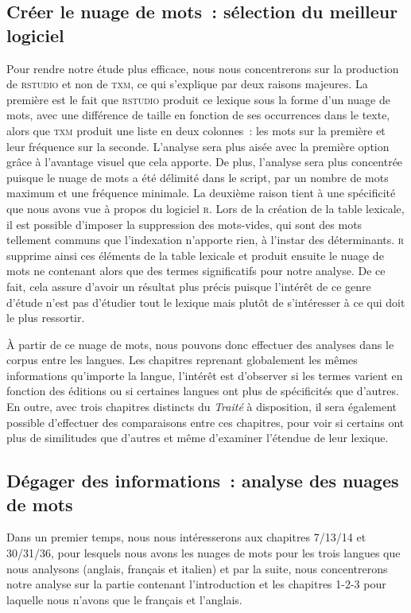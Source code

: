 \subsection{Créer le nuage de mots~: sélection du meilleur logiciel}
Pour rendre notre étude plus efficace, nous nous concentrerons sur la production de \textsc{rstudio} et non de \textsc{txm}, ce qui s'explique par deux raisons majeures. La première est le fait que \textsc{rstudio} produit ce lexique sous la forme d'un nuage de mots, avec une différence de taille en fonction de ses occurrences dans le texte, alors que \textsc{txm} produit une liste en deux colonnes~: les mots sur la première et leur fréquence sur la seconde. L'analyse sera plus aisée avec la première option grâce à l'avantage visuel que cela apporte. De plus, l'analyse sera plus concentrée puisque le nuage de mots a été délimité dans le script, par un nombre de mots maximum et une fréquence minimale. La deuxième raison tient à une spécificité que nous avons vue à propos du logiciel \textsc{r}. Lors de la création de la table lexicale, il est possible d'imposer la suppression des mots-vides, qui sont des mots tellement communs que l'indexation n'apporte rien, à l'instar des déterminants. \textsc{r} supprime ainsi ces éléments de la table lexicale et produit ensuite le nuage de mots ne contenant alors que des termes significatifs pour notre analyse. De ce fait, cela assure d'avoir un résultat plus précis puisque l'intérêt de ce genre d'étude n'est pas d'étudier tout le lexique mais plutôt de s'intéresser à ce qui doit le plus ressortir.

À partir de ce nuage de mots, nous pouvons donc effectuer des analyses dans le corpus entre les langues. Les chapitres reprenant globalement les mêmes informations qu'importe la langue, l'intérêt est d'observer si les termes varient en fonction des éditions ou si certaines langues ont plus de spécificités que d'autres. En outre, avec trois chapitres distincts du \emph{Traité} à disposition, il sera également possible d'effectuer des comparaisons entre ces chapitres, pour voir si certains ont plus de similitudes que d'autres et même d'examiner l'étendue de leur lexique.

\subsection{Dégager des informations~: analyse des nuages de mots}
Dans un premier temps, nous nous intéresserons aux chapitres 7/13/14 et 30/31/36, pour lesquels nous avons les nuages de mots pour les trois langues que nous analysons (anglais, français et italien) et par la suite, nous concentrerons notre analyse sur la partie contenant l'introduction et les chapitres 1-2-3 pour laquelle nous n'avons que le français et l'anglais.

